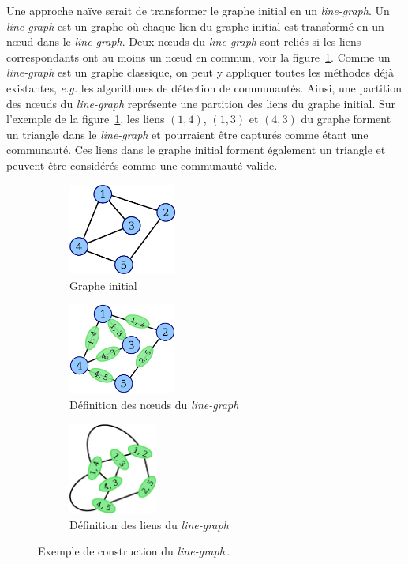 Une approche naïve serait de transformer le graphe initial en un \emph{line-graph}.
Un \emph{line-graph} est un graphe où chaque lien du graphe initial est transformé en un n\oe{}ud dans le \emph{line-graph}.
Deux n\oe{}uds du \emph{line-graph} sont reliés si les liens correspondants ont au moins un n\oe{}ud en commun, voir la figure~\ref{fig:ex_construction_lineG}.
Comme un \emph{line-graph} est un graphe classique, on peut y appliquer toutes les méthodes déjà existantes, \emph{e.g.} les algorithmes de détection de communautés.
Ainsi, une partition des n\oe{}uds du \emph{line-graph} représente une partition des liens du graphe initial.
Sur l'exemple de la figure~\ref{fig:ex_construction_lineG}, les liens $(1,4)$, $(1,3)$ et $(4, 3)$ du graphe forment un triangle dans le \emph{line-graph} et pourraient être capturés comme étant une communauté.
Ces liens dans le graphe initial forment également un triangle et peuvent être considérés comme une communauté valide.
\begin{figure}
\centering
	\begin{subfigure}{0.25\textwidth}
		\includegraphics[height=3cm]{img/ExpectedNodes/Line_graph_construction_1.eps}
		\caption{Graphe initial}
	\end{subfigure}\hspace*{0.5cm}
	\begin{subfigure}{0.25\textwidth}
		\includegraphics[height=3cm]{img/ExpectedNodes/Line_graph_construction_2.eps}
		\caption{Définition des n\oe{}uds du \emph{line-graph}}
	\end{subfigure}\hspace*{0.5cm}
	\begin{subfigure}{0.25\textwidth}
		\includegraphics[height=3cm]{img/ExpectedNodes/Line_graph_construction_3.eps}
		\caption{Définition des liens du \emph{line-graph}}
	\end{subfigure}	
	\caption{Exemple de construction du \emph{line-graph}\,\protect\footnotemark.}
	\label{fig:ex_construction_lineG}
\end{figure}

